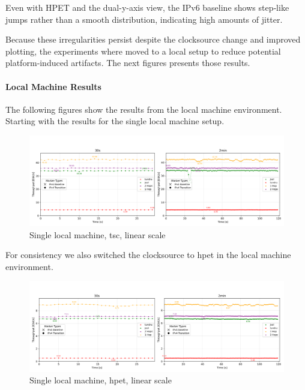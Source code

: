 Even with HPET and the dual-y-axis view, the IPv6 baseline shows step‑like jumps rather than a smooth distribution, indicating high amounts of jitter.

Because these irregularities persist despite the clocksource change and improved plotting, the experiments where moved to a local setup to reduce potential platform‑induced artifacts. 
The next figures presents those results.

\paragraph{Local Machine Results}

The following figures show the results from the local machine environment. 
Starting with the results for the single local machine setup. 

\begin{figure}[H]
    \centering
    \includegraphics[width=1\textwidth]{resources/plots/CombinedPlot/TCP/Single_tcp_sameScale_tsc_linear.png}
    \caption{Single local machine, tsc, linear scale}
    \label{fig:Local_tcp_sameScale_tsc_linear}
\end{figure}

For consistency we also switched the clocksource to hpet in the local machine environment.

\begin{figure}[H]
    \centering
    \includegraphics[width=1\textwidth]{resources/plots/CombinedPlot/TCP/Single_tcp_sameScale_hpet_linear.png}
    \caption{Single local machine, hpet, linear scale}
    \label{fig:Local_tcp_sameScale_hpet_linear}
\end{figure}

